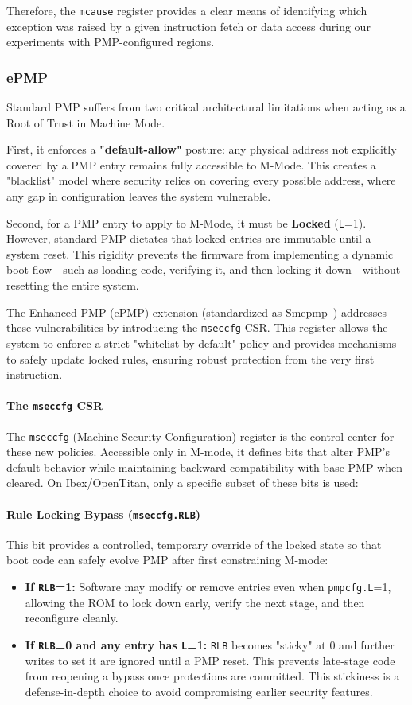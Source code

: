 \documentclass[10pt,a4paper,twocolumn,twoside]{article}
\begin{document}
\noindent Therefore, the \texttt{mcause} register provides a clear means of identifying which exception was raised by a given instruction fetch or data access during our experiments with PMP-configured regions. 


\subsubsection{ePMP}
Standard PMP suffers from two critical architectural limitations when acting as a Root of Trust in Machine Mode. 

First, it enforces a \textbf{"default-allow"} posture: any physical address not explicitly covered by a PMP entry remains fully accessible to M-Mode. This creates a "blacklist" model where security relies on covering every possible address, where any gap in configuration leaves the system vulnerable.

Second, for a PMP entry to apply to M-Mode, it must be \textbf{Locked} (\texttt{L}=1). However, standard PMP dictates that locked entries are immutable until a system reset. This rigidity prevents the firmware from implementing a dynamic boot flow - such as loading code, verifying it, and then locking it down - without resetting the entire system.

The Enhanced PMP (ePMP) extension (standardized as Smepmp~\cite{epmp}) addresses these vulnerabilities by introducing the \texttt{mseccfg} CSR. This register allows the system to enforce a strict "whitelist-by-default" policy and provides mechanisms to safely update locked rules, ensuring robust protection from the very first instruction.

\paragraph{The \texttt{mseccfg} CSR}
The \texttt{mseccfg} (Machine Security Configuration) register is the control center for these new policies. Accessible only in M-mode, it defines bits that alter PMP's default behavior while maintaining backward compatibility with base PMP when cleared. On Ibex/OpenTitan, only a specific subset of these bits is used:

\paragraph{Rule Locking Bypass (\texttt{mseccfg.RLB})}
This bit provides a controlled, temporary override of the locked state so that boot code can safely evolve PMP after first constraining M-mode:
\begin{itemize}
\item \textbf{If \texttt{RLB}=1:} Software may modify or remove entries even when \texttt{pmpcfg.L}=1, allowing the ROM to lock down early, verify the next stage, and then reconfigure cleanly.
\item \textbf{If \texttt{RLB}=0 and any entry has \texttt{L}=1:} \texttt{RLB} becomes "sticky" at 0 and further writes to set it are ignored until a PMP reset. This prevents late-stage code from reopening a bypass once protections are committed. This stickiness is a defense-in-depth choice to avoid compromising earlier security features.
\end{itemize}
\end{document}
